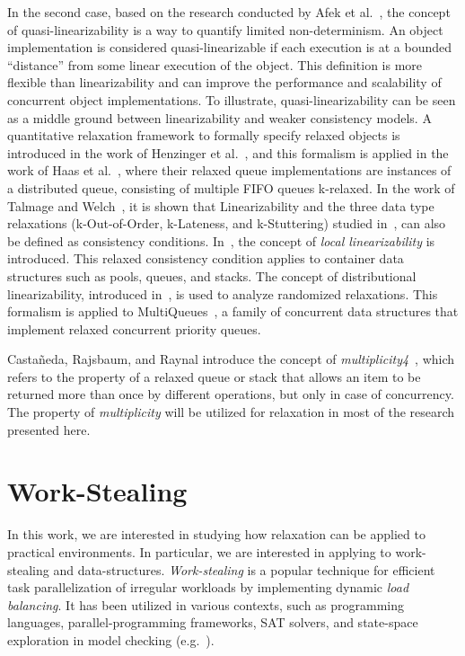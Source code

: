 In the second case, based on the research conducted by Afek et al.~\cite{DBLP_conf_opodis_AfekKY10}, the concept of quasi-linearizability is a way to quantify limited non-determinism. An object implementation is considered quasi-linearizable if each execution is at a bounded ``distance'' from some linear execution of the object. This definition is more flexible than linearizability and can improve the performance and scalability of concurrent object implementations. To illustrate, quasi-linearizability can be seen as a middle ground between linearizability and weaker consistency models. A quantitative relaxation framework to formally specify relaxed objects is introduced in the work of Henzinger et al.~\cite{DBLP_conf_popl_HenzingerKPSS13}, and this formalism is applied in the work of Haas et al.~\cite{DBLP_conf_cf_HaasLHPSKS13}, where their relaxed queue implementations are instances of a distributed queue, consisting of multiple FIFO queues k-relaxed. In the work of Talmage and Welch~\cite{DBLP_journals_algorithms_TalmageW18}, it is shown that Linearizability and the three data type relaxations (k-Out-of-Order, k-Lateness, and k-Stuttering) studied in~\cite{DBLP_conf_popl_HenzingerKPSS13},  can also be defined as consistency conditions. In~\cite{DBLP_conf_concur_HaasHHKLPSSV16}, the concept of \textit{local linearizability} is introduced. This relaxed consistency condition applies to container data structures such as pools, queues, and stacks. The concept of distributional linearizability, introduced in~\cite{DBLP_conf_spaa_Alistarh0KLN18}, is used to analyze randomized relaxations. This formalism is applied to MultiQueues~\cite{DBLP_conf_spaa_RihaniSD15}, a family of concurrent data structures that implement relaxed concurrent priority queues.

Castañeda, Rajsbaum, and Raynal introduce the concept of \emph{multiplicity4}~\cite{DBLP_conf_opodis_CastanedaRR20}, which refers to the property of a relaxed queue or stack that allows an item to be returned more than once by different operations, but only in case of concurrency. The property of \emph{multiplicity} will be utilized for relaxation in most of the research presented here.

\section{\label{section:work-stealing}Work-Stealing}

In this work, we are interested in studying how relaxation can be applied to practical environments. In particular, we are interested in applying to work-stealing and data-structures. \emph{Work-stealing} is a popular technique for efficient task parallelization of irregular workloads by implementing dynamic \emph{load balancing}. It has been utilized in various contexts, such as programming languages, parallel-programming frameworks, SAT solvers, and state-space exploration in model checking (e.g.~\cite{DBLP_journals_tpds_AyguadeCDHLMTUZ09,
  DBLP_journals_jpdc_BlumofeJKLRZ96, DBLP_journals_tpds_AyguadeCDHLMTUZ09, DBLP_conf_jvm_FloodDSZ01, DBLP_conf_pldi_FrigoLR98, DBLP_conf_java_Lea00, DBLP_conf_hpca_RangerRPBK07}).

